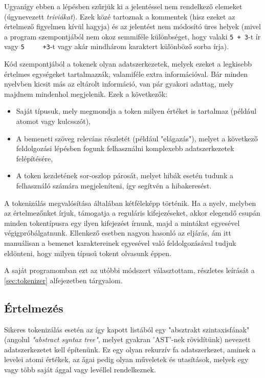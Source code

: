 Ugyanígy ebben a lépésben szűrjük ki a jelentéssel nem rendelkező elemeket (úgynevezett \textit{triviákat}). Ezek közé tartoznak a kommentek (hisz ezeket az értelmező figyelmen kívül hagyja) és az jelentést nem módosító üres helyek (mivel a program szempontjából nem okoz semmiféle különbséget, hogy valaki \verb|5 + 3|-t ír vagy \verb|5     +3|-t vagy akár mindhárom karaktert különböző sorba írja).

Kód szempontjából a tokenek olyan adatszerkezetek, melyek ezeket a legkisebb értelmes egységeket tartalmazzák, valamiféle extra információval. Bár minden nyelvben kicsit más az eltárolt információ, van pár gyakori adattag, mely majdnem mindenhol megjelenik. Ezek a következők:

\begin{itemize}
    \item Saját típusuk, mely megmondja a token milyen értéket is tartalmaz (például atomot vagy kulcsszót),
    \item A bemeneti szöveg releváns részletét (például "elágazás"), melyet a következő feldolgozási lépésben fogunk felhasználni komplexebb adatszerkezetek felépítésére,
    \item A token kezdetének sor-oszlop párosát, melyet hibák esetén tudunk a felhasználó számára megjeleníteni, így segítvén a hibakeresést.
\end{itemize}

A tokenizálás megvalósítása általában kétféleképp történik. Ha a nyelv, melyben az értelmezőnket írjuk, támogatja a reguláris kifejezéseket, akkor elegendő csupán minden tokentípusra egy ilyen kifejezést írnunk, majd a mintákat egyesével végigpróbálgatnunk. Ellenkező esetben nagyon hasonló az eljárás, ám itt manuálisan a bemenet karaktereinek egyesével való feldolgozásával tudjuk eldönteni, hogy milyen típusú tokent olvasunk éppen.

A saját programomban ezt az utóbbi módszert választottam, részletes leírását a \ref{sec:tokenizer} alfejezetben tárgyalom.

\subsection{Értelmezés}

Sikeres tokenizálás esetén az így kapott listából egy "absztrakt szintaxisfának" (angolul \textit{"abstract syntax tree"}, melyet gyakran 'AST'-nek rövidítünk) nevezett adatszerkezetet kell építenünk. Ez egy olyan rekurzív fa adatszerkezet, aminek a levelei atomi értékek, az ágai pedig olyan műveletek és utasítások, melyek egy vagy több saját ággal vagy levéllel rendelkeznek.

